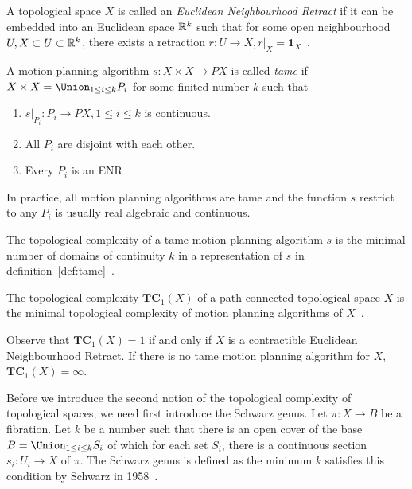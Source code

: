 A topological space \(X\) is called an \textit{Euclidean Neighbourhood Retract} if it can be embedded into an Euclidean space \(\mathbb{R}^k\) such that for some open neighbourhood \(U, X\subset U\subset \mathbb{R}^k\), there exists a retraction \(r:U\to X,r|_X=\mathbf{1}_X\)~\cite{farber2004instabilities}.
\begin{definition}\label{def:tame}
  A motion planning algorithm \(s:X\times X\to PX\) is called \emph{tame} if \(X\times X=\Union_{1\le i\le k} P_i\) for some finited number \(k\) such that
  \begin{enumerate}[label=\arabic*)]
  \item \(s|_{P_i}:P_i\to PX, 1\le i\le k\) is continuous.
  \item All \(P_i\) are disjoint with each other.
  \item Every \(P_i\) is an ENR
  \end{enumerate}
\end{definition}

In practice, all motion planning algorithms are tame and the function \(s\) restrict to any \(P_i\) is usually real algebraic and continuous.

\begin{definition}
  The topological complexity of a tame motion planning algorithm \(s\) is the minimal number of domains of continuity \(k\) in a representation of \(s\) in definition~\ref{def:tame}~\cite{farber2006topology}.
\end{definition}

\begin{definition}
  The topological complexity \(\mathbf{TC}_1(X)\) of a path-connected topological space \(X\) is the minimal topological complexity of motion planning algorithms of \(X\)~\cite{farber2006topology}.
\end{definition}

Observe that \(\mathbf{TC}_1(X)=1\) if and only if \(X\) is a contractible Euclidean Neighbourhood Retract.
If there is no tame motion planning algorithm for \(X\), \(\mathbf{TC}_1(X)=\infty\).

Before we introduce the second notion of the topological complexity of topological spaces, we need first introduce the Schwarz genus.
Let \(\pi: X\to B\) be a fibration. Let \(k\) be a number such that there is an open cover of the base \(B=\Union_{1\le i\le k} S_i\) of which for each set \(S_i\), there is a continuous section \(s_i:U_i\to X\) of \(\pi\).
The Schwarz genus is defined as the minimum \(k\) satisfies this condition by Schwarz in 1958~\cite{schwarz1962genus}.

